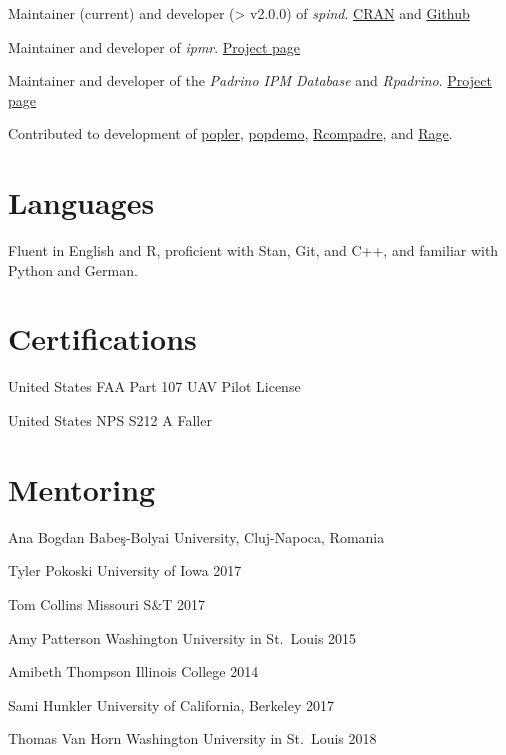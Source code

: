 \documentclass[11pt,]{article}
\begin{document}
Maintainer (current) and developer (\textgreater{} v2.0.0) of
\emph{spind}.
\href{https://cran.r-project.org/web/checks/check_results_spind.html}{CRAN}
and \href{https://github.com/levisc8/spind}{Github}

Maintainer and developer of \emph{ipmr}.
\href{https://levisc8.github.io/ipmr/}{Project page}

Maintainer and developer of the \emph{Padrino IPM Database} and
\emph{Rpadrino}. \href{https://github.com/levisc8/RPadrino}{Project
page}

Contributed to development of
\href{https://github.com/AldoCompagnoni/popler}{popler},
\href{https://github.com/iainmstott/popdemo}{popdemo},
\href{https://github.com/jonesor/Rcompadre}{Rcompadre}, and
\href{https://github.com/jonesor/Rage}{Rage}.

\hypertarget{languages}{%
\section{Languages}\label{languages}}

Fluent in English and R, proficient with Stan, Git, and C++, and
familiar with Python and German.

\hypertarget{certifications}{%
\section{Certifications}\label{certifications}}

United States FAA Part 107 UAV Pilot License

United States NPS S212 A Faller

\hypertarget{mentoring}{%
\section{Mentoring}\label{mentoring}}

Ana Bogdan \hfill Babe\c s-Bolyai University, Cluj-Napoca, Romania

Tyler Pokoski \hfill  University of Iowa 2017

Tom Collins \hfill Missouri S\&T 2017

Amy Patterson \hfill Washington University in St.~Louis 2015

Amibeth Thompson \hfill Illinois College 2014

Sami Hunkler \hfill University of California, Berkeley 2017

Thomas Van Horn \hfill Washington University in St.~Louis 2018
\end{document}
